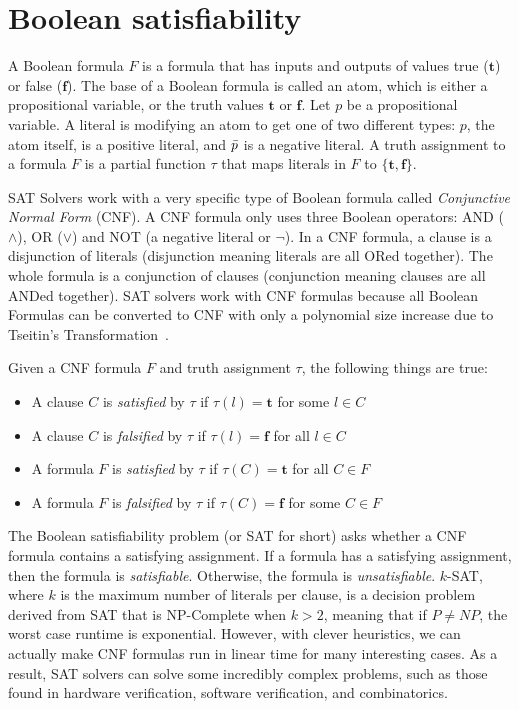\section{Boolean satisfiability} \label{subsec:boolSAT}
A Boolean formula $F$ is a formula that has inputs and outputs of values true ($\boldsymbol{t}$) or false ($\boldsymbol{f}$). The base of a Boolean formula is called an atom, which is either a propositional variable, or the truth values $\boldsymbol{t}$ or $\boldsymbol{f}$. Let $p$ be a propositional variable. A literal is modifying an atom to get one of two different types: $p$, the atom itself, is a positive literal, and $\Bar{p}$  is a negative literal. A truth assignment to a formula $F$ is a partial function $\tau$ that maps literals in $F$ to $\{\boldsymbol{t}, \boldsymbol{f}\}$. \par
SAT Solvers work with a very specific type of Boolean formula called \textit{Conjunctive Normal Form} (CNF). A CNF formula only uses three Boolean operators: AND ($\wedge$), OR ($\vee$) and NOT (a negative literal or $\neg$). In a CNF formula, a clause is a disjunction of literals (disjunction meaning literals are all ORed together). The whole formula is a conjunction of clauses (conjunction meaning clauses are all ANDed together). SAT solvers work with CNF formulas because all Boolean Formulas can be converted to CNF with only a polynomial size increase due to Tseitin's Transformation~\cite{Tseitin70}. \par
Given a CNF formula $F$ and truth assignment $\tau$, the following things are true:
\begin{itemize}
    \item A clause $C$ is \textit{satisfied} by $\tau$ if $\tau(l) = \boldsymbol{t}$ for some $l \in C$
    \item A clause $C$ is \textit{falsified} by $\tau$ if $\tau(l) = \boldsymbol{f}$ for all $l \in C$
    \item A formula $F$ is \textit{satisfied} by $\tau$ if $\tau(C) = \boldsymbol{t}$ for all $C \in F$
    \item A formula $F$ is \textit{falsified} by $\tau$ if $\tau(C) = \boldsymbol{f}$ for some $C \in F$
\end{itemize}
The Boolean satisfiability problem (or SAT for short) asks whether a CNF formula contains a satisfying assignment. If a formula has a satisfying assignment, then the formula is \textit{satisfiable}. Otherwise, the formula is \textit{unsatisfiable}. $k$-SAT, where $k$ is the maximum number of literals per clause, is a decision problem derived from SAT that is NP-Complete when $k > 2$, meaning that if $P \ne NP$, the worst case runtime is exponential. However, with clever heuristics, we can actually make CNF formulas run in linear time for many interesting cases. As a result, SAT solvers can solve some incredibly complex problems, such as those found in hardware verification, software verification, and combinatorics.

